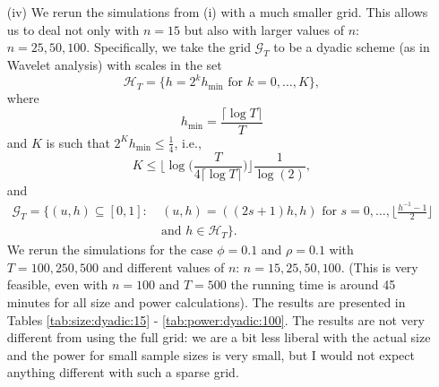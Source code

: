 \documentclass[a4paper,12pt]{article}
\begin{document}
\begin{enumerate}[label=\arabic*.,leftmargin=0.6cm]
{\begin{itemize}[topsep=0pt]
\item[(iv)] We rerun the simulations from (i) with a much smaller grid. This allows us to deal not only with $n=15$ but also with larger values of $n$: $n=25, 50, 100$. Specifically, we take the grid $\mathcal{G}_T$ to be a dyadic scheme (as in Wavelet analysis) with scales in the set 
\[ \mathcal{H}_T = \big\{ h = 2^k h_{\min} \text{ for } k=0,\ldots,K \big\}, \]  
where 
\[ h_{\min} = \frac{\lceil \log T \rceil}{T} \]
and $K$ is such that $2^K h_{\min} \le \frac{1}{4}$, i.e.,
\[ K \le \Big\lfloor \log\Big(\frac{T}{4 \lceil \log T \rceil }\Big) \Big\rfloor \frac{1}{\log(2)}, \]
and 
\begin{align*}
\mathcal{G}_T = \big\{ (u,h) \subseteq [0,1]: & \ (u,h) = ((2s+1) h, h) \text{ for } s = 0,\ldots,\Big\lfloor \frac{h^ {-1}-1}{2} \Big\rfloor \\ & \ \text{and } h \in \mathcal{H}_T \big\}.
\end{align*}
{\color{red} We rerun the simulations for the case $\phi = 0.1$ and $\rho = 0.1$ with $T=100, 250, 500$ and different values of $n$: $n=15, 25, 50, 100$. (This is very feasible, even with $n = 100$ and $T = 500$ the running time is around 45 minutes for all size and power calculations). The results are presented in Tables \ref{tab:size:dyadic:15} - \ref{tab:power:dyadic:100}. The results are not very different from using the full grid: we are a bit less liberal with the actual size and the power for small sample sizes is very small, but I would not expect anything different with such a sparse grid.}


\end{itemize}}
\end{enumerate}
\end{document}
